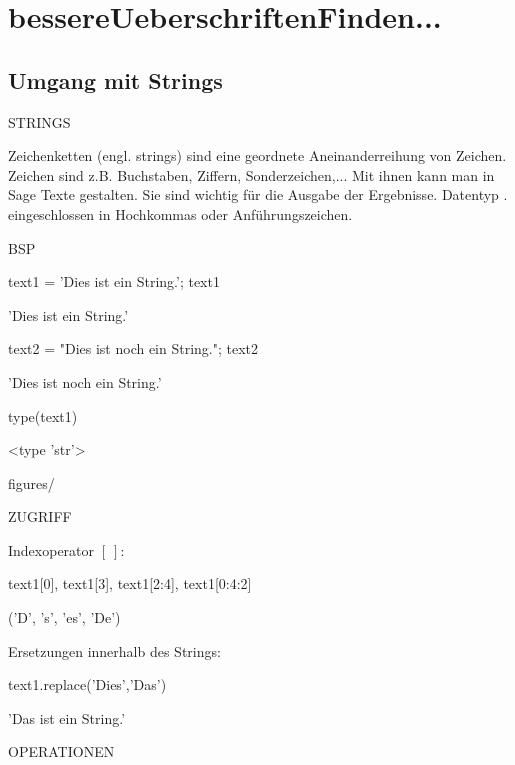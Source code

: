 \documentclass[fontsize=12pt,paper=a4,twoside,bibtotoc,idxtotoc,
liststotoc,pagesize,BCOR1.2cm,DIV15,chapterprefix,pagesize=pdftex]{scrbook}
\theoremstyle{plain}
\theoremstyle{definition}
\theoremstyle{remark}
\begin{document}
\chapter{bessereUeberschriftenFinden...}
\section{Umgang mit Strings}

STRINGS


 Zeichenketten (engl. {\color{red} strings}) sind eine geordnete
Aneinanderreihung von Zeichen. Zeichen sind z.B. Buchstaben, Ziffern,
Sonderzeichen,...
 Mit ihnen kann man in Sage Texte gestalten. Sie sind wichtig
für die Ausgabe der Ergebnisse.
 Datentyp .
 eingeschlossen in Hochkommas oder Anführungszeichen.


BSP

\begin{sagein}
text1 = 'Dies ist ein String.'; text1
\end{sagein}
\begin{sage}
'Dies ist ein String.'
\end{sage}
\begin{sagein}
text2 = "Dies ist noch ein String."; text2
\end{sagein}
\begin{sage}
'Dies ist noch ein String.'
\end{sage}
\begin{sagein}
type(text1)
\end{sagein}
\begin{sage}
<type 'str'>
\end{sage}figures/

ZUGRIFF


 Indexoperator {\color{blue}$[\ ]$}:
\begin{sagein}
text1[0], text1[3], text1[2:4], text1[0:4:2]
\end{sagein}
\begin{sage}
('D', 's', 'es', 'De')
\end{sage}
 Ersetzungen innerhalb des Strings:
\begin{sagein}
text1.replace('Dies','Das')
\end{sagein}
\begin{sage}
'Das ist ein String.'
\end{sage}


OPERATIONEN
\end{document}
